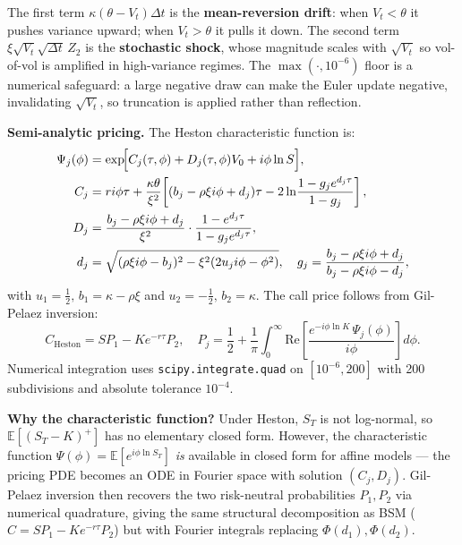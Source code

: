 \documentclass[12pt,a4paper]{article}
\begin{document}
The first term $\kappa(\theta-V_t)\Delta t$ is the \textbf{mean-reversion drift}:
when $V_t<\theta$ it pushes variance upward; when $V_t>\theta$ it pulls it down.
The second term $\xi\sqrt{V_t}\sqrt{\Delta t}\,Z_2$ is the \textbf{stochastic
shock}, whose magnitude scales with $\sqrt{V_t}$ so vol-of-vol is amplified in
high-variance regimes.  The $\max(\cdot,10^{-6})$ floor is a numerical safeguard:
a large negative draw can make the Euler update negative, invalidating
$\sqrt{V_t}$, so truncation is applied rather than reflection.

\textbf{Semi-analytic pricing.}
The Heston characteristic function is:
\begin{align}
  \Psi_j(\phi) &= \exp\!\Bigl[C_j(\tau,\phi) + D_j(\tau,\phi)V_0
                 + i\phi\ln S\Bigr],
  \label{eq:heston_cf}\\
  C_j &= ri\phi\tau + \frac{\kappa\theta}{\xi^2}
         \!\left[(b_j - \rho\xi i\phi + d_j)\tau
         - 2\ln\!\frac{1-g_j e^{d_j\tau}}{1-g_j}\right],
  \label{eq:heston_C}\\
  D_j &= \frac{b_j-\rho\xi i\phi+d_j}{\xi^2}\cdot
         \frac{1-e^{d_j\tau}}{1-g_j e^{d_j\tau}},
  \label{eq:heston_D}\\
  d_j &= \sqrt{(\rho\xi i\phi - b_j)^2 - \xi^2(2u_j i\phi - \phi^2)},
  \quad g_j = \frac{b_j-\rho\xi i\phi+d_j}{b_j-\rho\xi i\phi-d_j},
\end{align}
with $u_1=\tfrac12,\,b_1=\kappa-\rho\xi$ and $u_2=-\tfrac12,\,b_2=\kappa$.
The call price follows from Gil-Pelaez inversion:
\begin{equation}
  C_{\mathrm{Heston}} = SP_1 - Ke^{-r\tau}P_2,
  \quad P_j = \frac12 + \frac{1}{\pi}
              \int_0^\infty \mathrm{Re}\!\left[
              \frac{e^{-i\phi\ln K}\,\Psi_j(\phi)}{i\phi}\right]d\phi.
  \label{eq:heston_price}
\end{equation}
Numerical integration uses \texttt{scipy.integrate.quad} on $[10^{-6},200]$
with 200 subdivisions and absolute tolerance $10^{-4}$.

\textbf{Why the characteristic function?}  Under Heston, $S_T$ is not
log-normal, so $\mathbb{E}[(S_T-K)^+]$ has no elementary closed form.
However, the characteristic function $\Psi(\phi)=\mathbb{E}[e^{i\phi\ln S_T}]$
\emph{is} available in closed form for affine models --- the pricing PDE
becomes an ODE in Fourier space with solution $(C_j, D_j)$.  Gil-Pelaez
inversion then recovers the two risk-neutral probabilities $P_1, P_2$
via numerical quadrature, giving the same structural decomposition as BSM
($C = SP_1 - Ke^{-r\tau}P_2$) but with Fourier integrals replacing $\Phi(d_1), \Phi(d_2)$.
\end{document}
